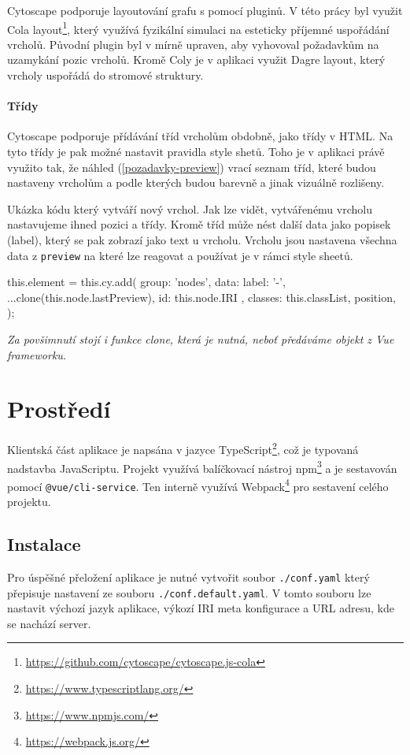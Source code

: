 Cytoscape podporuje layoutování grafu s pomocí pluginů. V této prácy byl využit Cola layout\footnote{\url{https://github.com/cytoscape/cytoscape.js-cola}}, který využívá fyzikální simulaci na esteticky příjemné uspořádání vrcholů. Původní plugin byl v mírně upraven, aby vyhovoval požadavkům na uzamykání pozic vrcholů. Kromě Coly je v aplikaci využit Dagre layout, který vrcholy uspořádá do stromové struktury.

\paragraph{Třídy} Cytoscape podporuje přídávání tříd vrcholům obdobně, jako třídy v HTML. Na tyto třídy je pak možné nastavit pravidla style shetů. Toho je v aplikaci právě využito tak, že náhled (\ref{pozadavky-preview}) vrací seznam tříd, které budou nastaveny vrcholům a podle kterých budou barevně a jinak vizuálně rozlišeny.


\begin{prikl}
Ukázka kódu který vytváří nový vrchol. Jak lze vidět, vytvářenému vrcholu nastavujeme ihned pozici a třídy. Kromě tříd může nést další data jako popisek (label), který se pak zobrazí jako text u vrcholu. Vrcholu jsou nastavena všechna data z \texttt{preview} na které lze reagovat a používat je v rámci style sheetů.
\begin{code}
this.element = this.cy.add({
    group: 'nodes',
    data: {
      label: '-',
      ...clone(this.node.lastPreview),
      id: this.node.IRI
    },
    classes: this.classList,
    position,
});
\end{code}
\textit{Za povšimnutí stojí i funkce clone, která je nutná, neboť předáváme objekt z Vue frameworku.}
\end{prikl}


\newpage





\section{Prostředí}
Klientská část aplikace je napsána v jazyce TypeScript\footnote{\url{https://www.typescriptlang.org/}}, což je typovaná nadstavba JavaScriptu. Projekt využívá balíčkovací nástroj npm\footnote{\url{https://www.npmjs.com/}} a je sestavován pomocí \texttt{@vue/cli-service}. Ten interně využívá Webpack\footnote{\url{https://webpack.js.org/}} pro sestavení celého projektu.

\subsection{Instalace}
Pro úspěšné přeložení aplikace je nutné vytvořit soubor \texttt{./conf.yaml} který přepisuje nastavení ze souboru \texttt{./conf.default.yaml}. V tomto souboru lze nastavit výchozí jazyk aplikace, výkozí IRI meta konfigurace a URL adresu, kde se nachází server.

